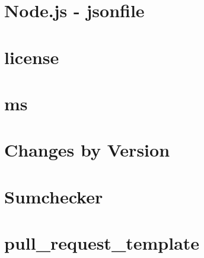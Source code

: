 \documentclass[twoside]{book}
\newcommand{\+}{\discretionary{\mbox{\scriptsize$\hookleftarrow$}}{}{}}
\begin{document}
\chapter{Node.\+js -\/ jsonfile}
\label{md_dsmacc_examples_DRmerge_node_modules_electron-packager_node_modules_jsonfile_README}

\chapter{license}
\label{md_dsmacc_examples_DRmerge_node_modules_electron-packager_node_modules_ms_license}

\chapter{ms}
\label{md_dsmacc_examples_DRmerge_node_modules_electron-packager_node_modules_ms_readme}

\chapter{Changes by Version}
\label{md_dsmacc_examples_DRmerge_node_modules_electron-packager_node_modules_sumchecker_NEWS}

\chapter{Sumchecker}
\label{md_dsmacc_examples_DRmerge_node_modules_electron-packager_node_modules_sumchecker_README}

\chapter{pull\+\_\+request\+\_\+template}
\label{md_dsmacc_examples_DRmerge_node_modules_electron-packager_pull_request_template}

\end{document}
